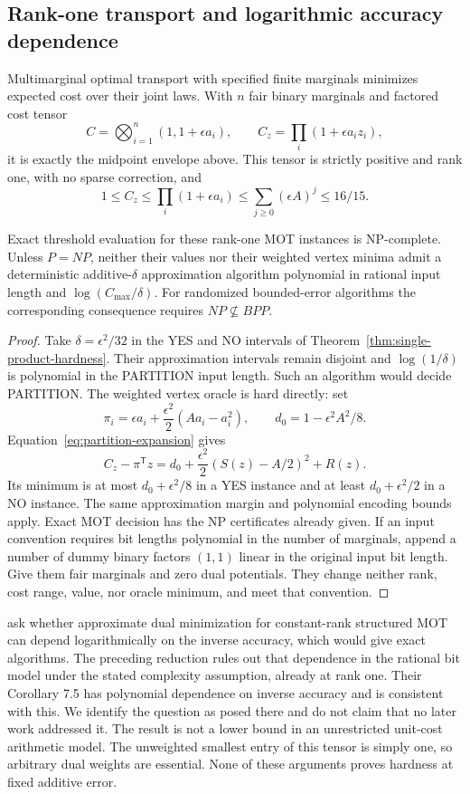\subsection{Rank-one transport and logarithmic accuracy dependence}
Multimarginal optimal transport with specified finite marginals minimizes
expected cost over their joint laws. With $n$ fair binary marginals and
factored cost tensor
\[
 C=\bigotimes_{i=1}^n(1,1+\epsilon a_i),\qquad
 C_z=\prod_i(1+\epsilon a_i z_i),
\]
it is exactly the midpoint envelope above. This tensor is strictly
positive and rank one, with no sparse correction, and
\[
 1\le C_z\le\prod_i(1+\epsilon a_i)
       \le\sum_{j\ge0}(\epsilon A)^j\le16/15.
\]
\begin{corollary}
\label{cor:rank-one-precision}
Exact threshold evaluation for these rank-one MOT instances is
NP-complete. Unless $P=NP$, neither their values nor their weighted
vertex minima admit a deterministic additive-$\delta$ approximation
algorithm polynomial in rational input length and
$\log(C_{\max}/\delta)$. For randomized bounded-error algorithms the
corresponding consequence requires $NP\not\subseteq BPP$.
\end{corollary}
\begin{proof}
Take $\delta=\epsilon^2/32$ in the YES and NO intervals of
Theorem~\ref{thm:single-product-hardness}. Their approximation intervals
remain disjoint and $\log(1/\delta)$ is polynomial in the PARTITION
input length. Such an algorithm would decide PARTITION.
The weighted vertex oracle is hard directly: set
\[
 \pi_i=\epsilon a_i+\frac{\epsilon^2}{2}(Aa_i-a_i^2),\qquad
 d_0=1-\epsilon^2A^2/8.
\]
Equation~\eqref{eq:partition-expansion} gives
\[
 C_z-\pi^{\mathsf T}z=d_0+\frac{\epsilon^2}{2}(S(z)-A/2)^2+R(z).
\]
Its minimum is at most $d_0+\epsilon^2/8$ in a YES instance and at
least $d_0+\epsilon^2/2$ in a NO instance. The same approximation margin
and polynomial encoding bounds apply. Exact MOT decision has the
NP certificates already given. If an input convention requires bit
lengths polynomial in the number of marginals, append a number of dummy
binary factors $(1,1)$ linear in the original input bit length. Give
them fair marginals and zero dual potentials. They change neither
rank, cost range, value, nor oracle minimum, and meet that convention.
\end{proof}

\citet[Section 7.2, after Theorem 7.4]{AltschulerBoixAdsera2023} ask
whether approximate dual minimization for constant-rank structured MOT
can depend logarithmically on the inverse accuracy, which would give exact
algorithms. The preceding reduction rules out that dependence in the
rational bit model under the stated complexity assumption, already at
rank one. Their Corollary 7.5 has polynomial dependence on inverse
accuracy and is consistent with this. We identify the question as posed
there and do not claim that no later work addressed it. The result is not
a lower bound in an unrestricted unit-cost arithmetic model. The
unweighted smallest entry of this tensor is simply one, so arbitrary dual
weights are essential. None of these arguments proves hardness at fixed
additive error.

